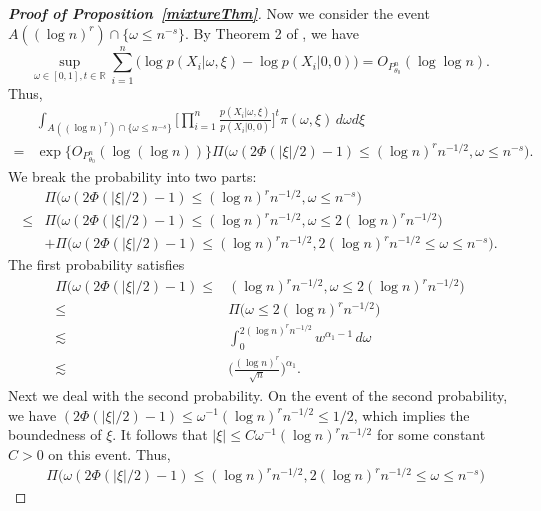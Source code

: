 \documentclass[11pt]{article}
\theoremstyle{plain}
\theoremstyle{definition}
\theoremstyle{remark}
\begin{document}
\begin{appendices}
\begin{proof}[\textbf{Proof of Proposition~\ref{mixtureThm}}]
Now we consider the event $A((\log n)^r)\cap \{\omega\leq n^{-s}\} $. By Theorem 2 of \cite{LIU200461}, we have 
\begin{equation*}
    \sup_{\omega\in [0,1],t\in \mathbb{R}}
    \sum_{i=1}^n \big(\log p(X_i|\omega,\xi)-\log p(X_i|0,0)\big)
    =O_{P^n_{\theta_0}}(\log \log n).
\end{equation*}
Thus,
\begin{align*}
    & \int_{A( (\log n)^r )\cap \{\omega\leq n^{-s}\}} \Big[\prod_{i=1}^n \frac{p(X_i|\omega,\xi)}{p(X_i|0,0)}\Big]^t \pi(\omega,\xi)\, d\omega d\xi
    \\
    =&\exp\big\{O_{P^n_{\theta_0}}(\log(\log n))\big\}
    \Pi\big(\omega(2\Phi(|\xi|/2)-1)\leq (\log n)^r n^{-1/2}, \omega\leq n^{-s}\big).
\end{align*}
We break the probability into two parts: 
\begin{align*}
    &\Pi\big(\omega(2\Phi(|\xi|/2)-1)\leq (\log n)^r n^{-1/2}, \omega\leq n^{-s}\big)
    \\
    \leq &
    \Pi\big(\omega(2\Phi(|\xi|/2)-1)\leq (\log n)^r n^{-1/2}, \omega\leq  2(\log n)^r n^{-1/2}\big)
    \\
    &
    +
    \Pi\big(\omega(2\Phi(|\xi|/2)-1)\leq (\log n)^r n^{-1/2},   2(\log n)^r n^{-1/2} \leq \omega\leq n^{-s}\big)
    .
\end{align*}
The first probability satisfies
\begin{align*}
    \Pi\big(\omega(2\Phi(|\xi|/2)-1)
    \leq & (\log n)^r n^{-1/2}, \omega\leq  2(\log n)^r n^{-1/2}\big)
    \\
    \leq &
    \Pi\big( \omega\leq  2(\log n)^r n^{-1/2}\big)
    \\
    \lesssim  &
    \int_{0}^{2(\log n)^r n^{-1/2}} w^{\alpha_1-1}\, d\omega
    \\
    \lesssim & \Big(\frac{(\log n)^r}{\sqrt{n}}\Big)^{\alpha_1}.
\end{align*}
Next we deal with the second probability.
On the event of the second probability, we have
$
    (2\Phi(|\xi|/2)-1)\leq \omega^{-1} (\log n)^r n^{-1/2}\leq 1/2
    $,
which implies the boundedness of $\xi$.
It follows that
$
|\xi|\leq C\omega^{-1} (\log n)^r n^{-1/2}
$
for some constant $C>0$ on this event.
Thus,
\begin{align*}
    &\Pi\big(\omega(2\Phi(|\xi|/2)-1)\leq (\log n)^r n^{-1/2},   2(\log n)^r n^{-1/2} \leq \omega\leq n^{-s}\big)

\end{align*}
\end{proof}
\end{appendices}
\end{document}
